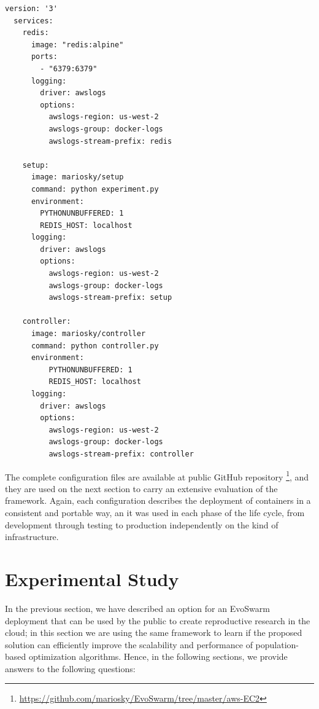 \documentclass[review]{elsarticle}
\begin{document}
\begin{lstlisting}[caption={docker-compose.yml for setup, controller and redis containers}, label=code:compose]
  version: '3'
  services:
    redis:
      image: "redis:alpine"
      ports:
        - "6379:6379"
      logging:
        driver: awslogs
        options:
          awslogs-region: us-west-2
          awslogs-group: docker-logs
          awslogs-stream-prefix: redis
  
    setup:
      image: mariosky/setup
      command: python experiment.py
      environment:
        PYTHONUNBUFFERED: 1
        REDIS_HOST: localhost
      logging:
        driver: awslogs
        options:
          awslogs-region: us-west-2
          awslogs-group: docker-logs
          awslogs-stream-prefix: setup
        
    controller:
      image: mariosky/controller
      command: python controller.py
      environment:
          PYTHONUNBUFFERED: 1
          REDIS_HOST: localhost
      logging:
        driver: awslogs
        options:
          awslogs-region: us-west-2
          awslogs-group: docker-logs
          awslogs-stream-prefix: controller
  \end{lstlisting}




%


The complete configuration files are available at public GitHub repository 
\footnote{\url{https://github.com/mariosky/EvoSwarm/tree/master/aws-EC2}}, and
they are used on the next section to carry an extensive evaluation of the framework.
Again, each configuration describes the deployment of containers in a consistent
and portable way, an it was used in each phase of the life cycle, from
development through testing to production independently on the kind of
infrastructure.


\section{Experimental Study} 
\label{setup} %


In the previous section, we have described an option for an EvoSwarm deployment that can be used by 
the public to create reproductive research in the cloud; in this section we are
using the same framework to learn if the proposed solution can efficiently
improve the scalability and performance of population-based optimization
algorithms. 
Hence, in the following sections, we provide answers to the following questions:
\end{document}
